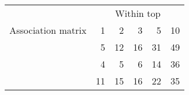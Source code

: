 \begin{tabular}{lrrrrr}\toprule
& \multicolumn{5}{c}{Within top} \\
\cmidrule{2-6}
Association matrix & 1 & 2 & 3 & 5 & 10 \\
\midrule
\fanasym{} & 5 & 12 & 16 & 31 & 49 \\
\fansym{} & 4 & 5 & 6 & 14 & 36 \\
\ngsym{} & 11 & 15 & 16 & 22 & 35 \\
\bottomrule
\end{tabular}
